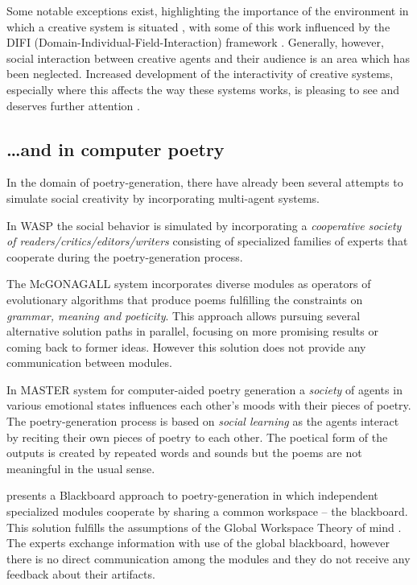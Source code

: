 Some notable exceptions exist, highlighting the importance of the
environment in which a creative system is situated \cite{mcgraw93,
  sosa09, perezyperez10MM, pease10, saunders12}, with some of this
work influenced by the DIFI (Domain-Individual-Field-Interaction)
framework \cite{csik88}. Generally, however, social interaction
between creative agents and their audience is an area which has been
neglected. Increased development of the interactivity of creative
systems, especially where this affects the way these systems works, is
pleasing to see and deserves further attention
\cite{coltonwiggins12}.

\subsection{\ldots and in computer poetry}

In the domain of poetry-generation, there have already been several attempts to simulate social creativity by incorporating multi-agent systems. 

In WASP \cite{gervas01, gervas10}  the social behavior is simulated by incorporating a \emph{cooperative society of readers/critics/editors/writers} consisting of specialized families of experts that cooperate during the poetry-generation process.

The McGONAGALL system \cite{manurung12} incorporates diverse modules as operators of evolutionary algorithms that produce poems fulfilling the constraints on \emph{grammar, meaning and poeticity}.  This approach allows pursuing several alternative solution paths in parallel, focusing on more promising results or coming back to former ideas. However this solution does not provide any communication between modules.

In MASTER system for computer-aided poetry generation \cite{kirke13} a \emph{society} of agents in various emotional states influences each other's moods with their pieces of poetry. The poetry-generation process is based on \emph{social learning} as the agents interact by reciting their own pieces of poetry to each other. The poetical form of the outputs is created by repeated words and sounds but the poems are not meaningful in the usual sense. 

\cite{misztal2014poetry} presents a Blackboard approach to poetry-generation in which independent specialized modules cooperate by sharing a common workspace -- the blackboard. This solution fulfills the assumptions of  the Global Workspace Theory of mind  \cite{baars97}. The experts exchange information with use of the global blackboard, however there is no direct communication among the modules and they do not receive any feedback about their artifacts.


